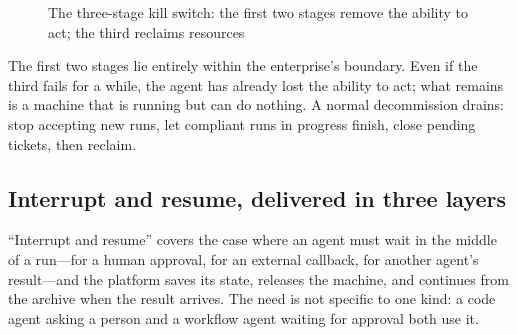 \begin{figure}[htbp]
\centering
{}
\caption[The three-stage kill switch]{The three-stage kill switch: the first two stages remove the ability to act; the third reclaims resources}
\label{fig:three-gate-kill}
\end{figure}

The first two stages lie entirely within the enterprise's boundary. Even if the third fails for a while, the agent has already lost the ability to act; what remains is a machine that is running but can do nothing. A normal decommission drains: stop accepting new runs, let compliant runs in progress finish, close pending tickets, then reclaim.

\subsection{Interrupt and resume, delivered in three layers}

``Interrupt and resume'' covers the case where an agent must wait in the middle of a run---for a human approval, for an external callback, for another agent's result---and the platform saves its state, releases the machine, and continues from the archive when the result arrives. The need is not specific to one kind: a code agent asking a person and a workflow agent waiting for approval both use it.

